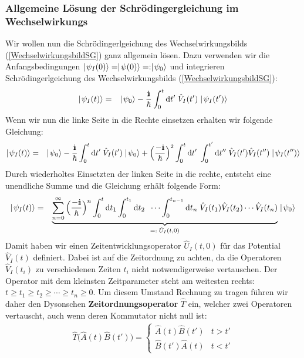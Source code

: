 \subsubsection{Allgemeine Lösung der Schrödingergleichung im Wechselwirkungs}

Wir wollen nun die Schrödingerlgeichung des Wechselwirkungsbilds (\ref{WechselwirkungsbildSG}) ganz allgemein lösen. Dazu verwenden wir die Anfangsbedingungen $\ket{\psi_I(0)}=\ket{\psi(0)}=:\ket{\psi_0}$ und integrieren Schrödingerlgeichung des Wechselwirkungsbilds (\ref{WechselwirkungsbildSG}): 
\begin{eqnarray*}
	\ket{\psi_I(t)} &=& \ket{\psi_0} - \frac{\I}{\hbar}\int_0^t \mathrm{d}t'\; \hat{V}_I(t') \ket{\psi_I(t')} 
\end{eqnarray*}
Wenn wir nun die linke Seite in die Rechte einsetzen erhalten wir folgende Gleichung: 
\begin{eqnarray*}
	\ket{\psi_I(t)} &=& \ket{\psi_0} - \frac{\I}{\hbar}\int_0^t\mathrm{d}t'\; \hat{V}_I(t') \ket{\psi_0} + \Big(\frac{-\I}{\hbar}\Big)^2 \int_0^t \mathrm{d}t'\; \int_0^{t'}\mathrm{d}t''\; \hat{V}_I(t')\hat{V}_I(t'')\ket{\psi_I(t'')}
\end{eqnarray*}
Durch wiederholtes Einsetzten der linken Seite in die rechte, entsteht eine unendliche Summe und die Gleichung erhält folgende Form:
\begin{eqnarray*}
	\ket{\psi_I(t)} &=& \underbrace{\sum_{n=0}^{\infty} \Big(\frac{-\I}{\hbar}\Big)^n \int_0^t\mathrm{d}t_1 \int_0^{t_1}\mathrm{d}t_2\;\; \cdots \int_0^{t_{n-1}}\mathrm{d}t_n\; \hat{V}_I(t_1)\hat{V}_I(t_2) \cdots \hat{V}_I(t_n)}_{=:\;\hat{U}_I(t,0)} \ket{\psi_0}
\end{eqnarray*}
Damit haben wir einen Zeitentwicklungsoperator $\hat{U}_I(t,0)$ für das Potential $\hat{V}_I(t)$ definiert. Dabei ist auf die Zeitordnung zu achten, da die Operatoren $\hat{V}_I(t_i)$ zu verschiedenen Zeiten $t_i$ nicht notwendigerweise vertauschen. Der Operator mit dem kleinsten Zeitparameter steht am weitesten rechts: $t\geq t_1\geq t_2\geq \cdots \geq t_n\geq 0$. Um diesem Umstand Rechnung zu tragen führen wir daher den Dysonschen {\bf Zeitordnungsoperator} $\widehat{T}$ ein, welcher zwei Operatoren vertauscht, auch wenn deren Kommutator nicht null ist:
\begin{eqnarray*}
	\widehat{T}\big(\hat{A}(t)\hat{B}(t')\big) = \left\{ \begin{array}{rl} \hat{A}(t)\hat{B}(t') & t > t'\\\hat{B}(t')\hat{A}(t) & t < t'\end{array}\right. 
\end{eqnarray*}
